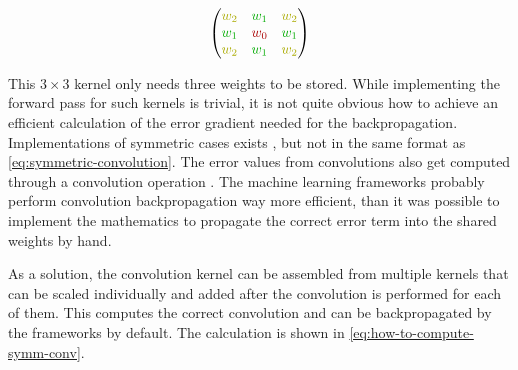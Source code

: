 \begin{equation}
    \label{eq:symmetric-convolution}
    \left(\begin{matrix}
        \textcolor{textyellow}{w_2} & \textcolor{textgreen}{w_1} & \textcolor{textyellow}{w_2}\\
        \textcolor{textgreen}{w_1} & \textcolor{textred}{w_0} & \textcolor{textgreen}{w_1}\\
        \textcolor{textyellow}{w_2} & \textcolor{textgreen}{w_1} & \textcolor{textyellow}{w_2}\\
    \end{matrix}\right)
\end{equation}

This $3\times 3$ kernel only needs three weights to be stored. 
While implementing the forward pass for such kernels is trivial, it is not quite obvious how to achieve an efficient calculation of the error gradient needed for the backpropagation.
Implementations of symmetric cases exists \cite{symmetricConvolutionImplementation}, but not in the same format as \autoref{eq:symmetric-convolution}.
The error values from convolutions also get computed through a convolution operation \cite{backpropagationInConvolutions}. 
The machine learning frameworks probably perform convolution backpropagation way more efficient, than it was possible to implement the mathematics to propagate the correct error term into the shared weights by hand.

As a solution, the convolution kernel can be assembled from multiple kernels that can be scaled individually and added after the convolution is performed for each of them.
This computes the correct convolution and can be backpropagated by the frameworks by default.
The calculation is shown in \autoref{eq:how-to-compute-symm-conv}.

